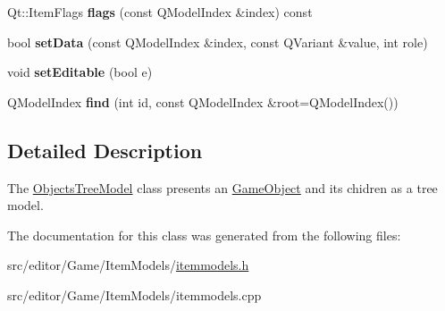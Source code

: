 \begin{DoxyCompactItemize}
\item 
\hypertarget{class_objects_tree_model_a7cbd6321c7f581a088d0e93418724898}{\-Qt\-::\-Item\-Flags {\bfseries flags} (const \-Q\-Model\-Index \&index) const }\label{class_objects_tree_model_a7cbd6321c7f581a088d0e93418724898}

\item 
\hypertarget{class_objects_tree_model_a33316c0c59125afb510d7df5d62784a4}{bool {\bfseries set\-Data} (const \-Q\-Model\-Index \&index, const \-Q\-Variant \&value, int role)}\label{class_objects_tree_model_a33316c0c59125afb510d7df5d62784a4}

\item 
\hypertarget{class_objects_tree_model_a39fa12bae610f2ff38250aac4633ce20}{void {\bfseries set\-Editable} (bool e)}\label{class_objects_tree_model_a39fa12bae610f2ff38250aac4633ce20}

\item 
\hypertarget{class_objects_tree_model_a98d3d2ed8e827ac26baf88ef6ac564ba}{\-Q\-Model\-Index {\bfseries find} (int id, const \-Q\-Model\-Index \&root=\-Q\-Model\-Index())}\label{class_objects_tree_model_a98d3d2ed8e827ac26baf88ef6ac564ba}

\end{DoxyCompactItemize}


\subsection{\-Detailed \-Description}
\-The \hyperlink{class_objects_tree_model}{\-Objects\-Tree\-Model} class presents an \hyperlink{class_game_object}{\-Game\-Object} and its chidren as a tree model. 

\-The documentation for this class was generated from the following files\-:\begin{DoxyCompactItemize}
\item 
src/editor/\-Game/\-Item\-Models/\hyperlink{itemmodels_8h}{itemmodels.\-h}\item 
src/editor/\-Game/\-Item\-Models/itemmodels.\-cpp\end{DoxyCompactItemize}
